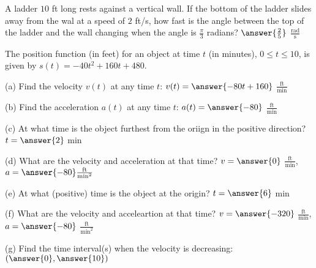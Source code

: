 \documentclass{ximera}
\begin{document}
\begin{exercise}
A ladder $10$ ft long rests against a vertical wall. If the bottom of the ladder slides away from the wal at a speed of $2$ ft/s, how fast is the angle between the top of the ladder and the wall changing when the angle is $\frac{\pi}{3}$ radians?  $\answer{\frac{2}{5}}$ $\frac{\text{rad}}{\text{s}}$
\end{exercise}

\begin{exercise}
The position function (in feet) for an object at time $t$ (in minutes), $0\leq t\leq 10$, is given by $s(t)=-40t^2+160t+480$.

(a) Find the velocity $v(t)$ at any time $t$: $v(t)=\answer{-80t+160}$ $\frac{\text{ft}}{\text{min}}$

(b) Find the acceleration $a(t)$ at any time $t$: $a(t)=\answer{-80}$ $\frac{\text{ft}}{\text{min}}$

(c) At what time is the object furthest from the oriign in the positive direction? $t=\answer{2}$ min

(d) What are the velocity and acceleration at that time? $v=\answer{0}$ $\frac{\text{ft}}{\text{min}}$, $a=\answer{-80} \frac{\text{ft}}{\text{min}^2}$

(e) At what (positive) time is the object at the origin? $t=\answer{6}$ min

(f) What are the velocity and acceleartion at that time? $v=\answer{-320}$ $\frac{\text{ft}}{\text{min}}$, $a=\answer{-80}$ $\frac{\text{ft}}{\text{min}^2}$

(g) Find the time interval(s) when the velocity is decreasing: $(\answer{0},\answer{10})$
\end{exercise}
\end{document}
